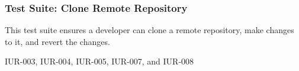 \subsubsection{Test Suite: Clone Remote Repository}
\begin{description}[align=right,leftmargin=3.2cm,labelindent=3.0cm]
\item[Purpose:] This test suite ensures a developer can clone a remote repository, make  changes to it, and revert the changes.
\item[Requirement:] IUR-003, IUR-004, IUR-005, IUR-007, and IUR-008
\end{description}
